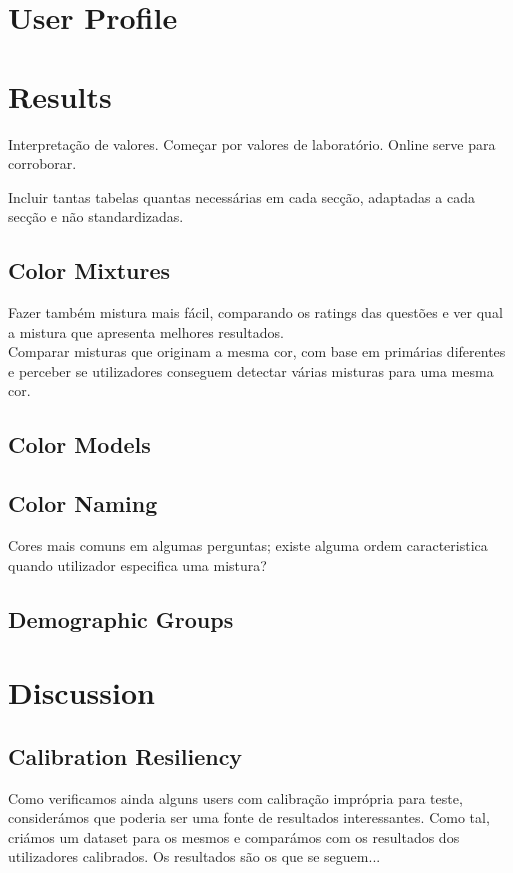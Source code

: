 \section{User Profile}
\label{sec:results_userprofile}

\section{Results}
\label{sec:results_results}
%
Interpretação de valores. Começar por valores de laboratório. Online serve para corroborar. \par
Incluir tantas tabelas quantas necessárias em cada secção, adaptadas a cada secção e não standardizadas.
%
\subsection{Color Mixtures}
\label{subsec:results_colormixtures}
%
Fazer também mistura mais fácil, comparando os ratings das questões e ver qual a mistura que apresenta melhores resultados. \\
Comparar misturas que originam a mesma cor, com base em primárias diferentes e perceber se utilizadores conseguem detectar várias
misturas para uma mesma cor.
%
\subsection{Color Models}
\label{subsec:results_colormodels}
%
\subsection{Color Naming}
\label{subsec:results_namingcolors}
%
Cores mais comuns em algumas perguntas; existe alguma ordem caracteristica quando utilizador especifica uma mistura?
%
\subsection{Demographic Groups}
\label{subsec:results_demographic}

\section{Discussion}
\label{sec:results_discussion}

\subsection{Calibration Resiliency}
\label{subsec:results_calibration}
%
Como verificamos ainda alguns users com calibração imprópria para teste, considerámos que poderia ser uma fonte de resultados
interessantes. Como tal, criámos um dataset para os mesmos e comparámos com os resultados dos utilizadores calibrados. Os resultados
são os que se seguem... \par
%
